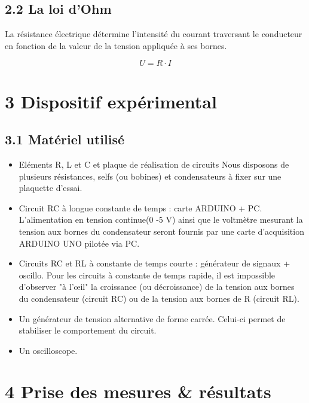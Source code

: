 \documentclass{report}
\begin{document}
\subsection*{2.2 La loi d'Ohm}
\hspace*{0.5cm}
La r\'esistance \'electrique d\'etermine l'intensit\'e du courant traversant le conducteur en fonction de la valeur de la tension appliqu\'ee \`a ses bornes.

\begin{equation}
    U = R \cdot I
\end{equation}


\section*{3 Dispositif exp\'erimental}
\subsection*{3.1 Mat\'eriel utilis\'e}
\begin{itemize}
\item Eléments R, L et C et plaque de réalisation de circuits 
Nous disposons de  plusieurs  résistances, selfs (ou  bobines) et condensateurs à fixer sur une plaquette d'essai. 

\item Circuit RC  à longue constante de temps : carte ARDUINO + PC. L’alimentation en tension  continue(0 -5  V)  ainsi  que  le voltmètre mesurant la  tension  aux bornes du condensateur seront fournis par une carte d’acquisition ARDUINO UNO pilotée via PC.  

\item Circuits RC et RL à constante de temps courte : générateur de signaux + oscillo. Pour  les  circuits  à  constante  de  temps  rapide,  il  est  impossible  d'observer "à l'œil" la croissance  (ou  décroissance)  de  la tension  aux  bornes  du  condensateur (circuit  RC)  ou  de  la tension  aux bornes de  R  (circuit  RL).

\item Un g\'en\'erateur de tension alternative de forme carr\'ee. Celui-ci permet de stabiliser le comportement du circuit.

\item Un oscilloscope.
\end{itemize}

\section*{4 Prise des mesures \& r\'esultats}
\end{document}
